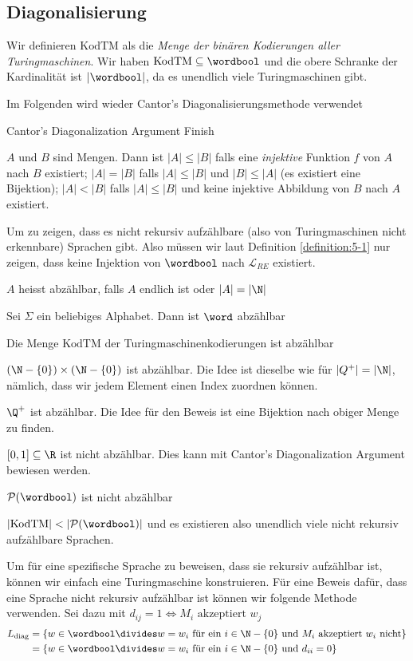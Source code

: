 \subsection{Diagonalisierung}
Wir definieren $\text{KodTM}$ als die \textit{Menge der binären Kodierungen aller Turingmaschinen}.
Wir haben $\text{KodTM} \subseteq \wordbool$ und die obere Schranke der Kardinalität ist $|\wordbool|$, da es unendlich viele Turingmaschinen gibt.

Im Folgenden wird wieder Cantor's Diagonalisierungsmethode verwendet
\begin{recall}[]{Cantor's Diagonalization Argument}
    \TODO Finish
\end{recall}

\inlinedef $A$ und $B$ sind Mengen. Dann ist $|A| \leq |B|$ falls eine \textit{injektive} Funktion $f$ von $A$ nach $B$ existiert;
$|A| = |B|$ falls $|A| \leq |B|$ und $|B| \leq |A|$ (es existiert eine Bijektion);
$|A| < |B|$ falls $|A| \leq |B|$ und keine injektive Abbildung von $B$ nach $A$ existiert.

Um zu zeigen, dass es nicht rekursiv aufzählbare (also von Turingmaschinen nicht erkennbare) Sprachen gibt.
Also müssen wir laut Definition \ref{definition:5-1} nur zeigen, dass keine Injektion von $\wordbool$ nach $\mathcal{L}_{RE}$ existiert.

 $A$ heisst abzählbar, falls $A$ endlich ist oder $|A| = |\N|$

\inlinelemma Sei $\Sigma$ ein beliebiges Alphabet. Dann ist $\word$ abzählbar

\inlinetheorem Die Menge $\text{KodTM}$ der Turingmaschinenkodierungen ist abzählbar

\inlinelemma $(\N - \{ 0 \}) \times (\N - \{ 0 \})$ ist abzählbar. Die Idee ist dieselbe wie für $|Q^+| = |\N|$, nämlich, dass wir jedem Element einen Index zuordnen können.

\inlinetheorem $\Q^+$ ist abzählbar. Die Idee für den Beweis ist eine Bijektion nach obiger Menge zu finden.

\inlinetheorem $[0, 1] \subseteq \R$ ist nicht abzählbar. Dies kann mit Cantor's Diagonalization Argument bewiesen werden.

\inlinetheorem $\mathcal{P}(\wordbool)$ ist nicht abzählbar

\inlinecorollary $|\text{KodTM}| < |\mathcal{P}(\wordbool)|$ und es existieren also unendlich viele nicht rekursiv aufzählbare Sprachen.

Um für eine spezifische Sprache zu beweisen, dass sie rekursiv aufzählbar ist, können wir einfach eine Turingmaschine konstruieren.
Für eine Beweis dafür, dass eine Sprache nicht rekursiv aufzählbar ist können wir folgende Methode verwenden. Sei dazu mit $d_{ij} = 1 \Longleftrightarrow M_i \text{ akzeptiert } w_j$
\begin{align*}
    L_{\text{diag}} & = \{ w \in \wordbool \divides w = w_i \text{ für ein } i \in \N - \{ 0 \} \text{ und } M_i \text{ akzeptiert } w_i \text{ nicht} \} \\
                    & = \{ w \in \wordbool \divides w = w_i \text{ für ein } i \in \N - \{ 0 \} \text{ und } d_{ii} = 0 \}
\end{align*}

